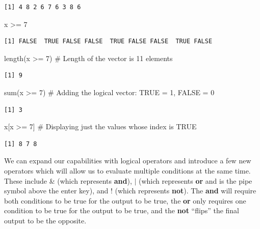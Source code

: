 \documentclass[
  letterpaper,
  DIV=11,
  numbers=noendperiod]{scrreprt}
\newenvironment{Shaded}{\begin{snugshade}}{\end{snugshade}}
\newcommand{\CommentTok}[1]{\textcolor[rgb]{0.37,0.37,0.37}{#1}}
\newcommand{\DecValTok}[1]{\textcolor[rgb]{0.68,0.00,0.00}{#1}}
\newcommand{\FunctionTok}[1]{\textcolor[rgb]{0.28,0.35,0.67}{#1}}
\newcommand{\NormalTok}[1]{\textcolor[rgb]{0.00,0.23,0.31}{#1}}
\newcommand{\SpecialCharTok}[1]{\textcolor[rgb]{0.37,0.37,0.37}{#1}}
\begin{document}
\begin{verbatim}
[1] 4 8 2 6 7 6 3 8 6
\end{verbatim}

\begin{Shaded}
\begin{Highlighting}[]
\NormalTok{x }\SpecialCharTok{\textgreater{}=} \DecValTok{7}
\end{Highlighting}
\end{Shaded}

\begin{verbatim}
[1] FALSE  TRUE FALSE FALSE  TRUE FALSE FALSE  TRUE FALSE
\end{verbatim}

\begin{Shaded}
\begin{Highlighting}[]
\FunctionTok{length}\NormalTok{(x }\SpecialCharTok{\textgreater{}=} \DecValTok{7}\NormalTok{) }\CommentTok{\# Length of the vector is 11 elements}
\end{Highlighting}
\end{Shaded}

\begin{verbatim}
[1] 9
\end{verbatim}

\begin{Shaded}
\begin{Highlighting}[]
\FunctionTok{sum}\NormalTok{(x }\SpecialCharTok{\textgreater{}=} \DecValTok{7}\NormalTok{) }\CommentTok{\# Adding the logical vector: TRUE = 1, FALSE = 0}
\end{Highlighting}
\end{Shaded}

\begin{verbatim}
[1] 3
\end{verbatim}

\begin{Shaded}
\begin{Highlighting}[]
\NormalTok{x[x }\SpecialCharTok{\textgreater{}=} \DecValTok{7}\NormalTok{] }\CommentTok{\# Displaying just the values whose index is TRUE}
\end{Highlighting}
\end{Shaded}

\begin{verbatim}
[1] 8 7 8
\end{verbatim}

We can expand our capabilities with logical operators and introduce a
few new operators which will allow us to evaluate multiple conditions at
the same time. These include \& (which represents \textbf{and}),
\(\vert\) (which represents \textbf{or} and is the pipe symbol above the
enter key), and ! (which represents \textbf{not}). The \textbf{and} will
require both conditions to be true for the output to be true, the
\textbf{or} only requires one condition to be true for the output to be
true, and the \textbf{not} ``flips'' the final output to be the
opposite.
\end{document}
